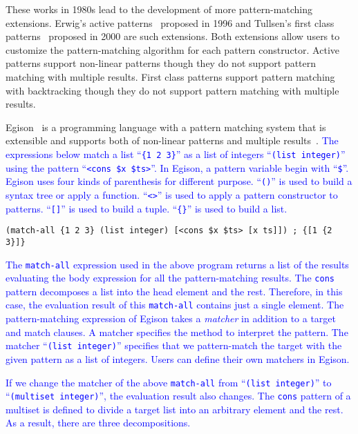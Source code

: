\documentclass[acmlarge]{acmart}
\newcommand{\new}[1]{\textcolor{blue}{#1}}
\begin{document}
These works in 1980s lead to the development of more pattern-matching extensions.
Erwig's active patterns~\cite{erwig1996active} proposed in 1996 and Tullsen's first class patterns~\cite{tullsen2000first} proposed in 2000 are such extensions.
Both extensions allow users to customize the pattern-matching algorithm for each pattern constructor.
Active patterns support non-linear patterns though they do not support pattern matching with multiple results.
First class patterns support pattern matching with backtracking though they do not support pattern matching with multiple results.

Egison~\cite{egisonWeb} is a programming language with a pattern matching system that is extensible and supports both of non-linear patterns and multiple results~\cite{egi2018aplas}.
\new{
The expressions below match a list ``\texttt{\{1 2 3\}}'' as a list of integers ``\lstinline{(list integer)}'' using the pattern ``\lstinline{<cons $x $ts>}''.
In Egison, a pattern variable begin with ``\lstinline{$}''.
Egison uses four kinds of parenthesis for different purpose.
``\lstinline{()}'' is used to build a syntax tree or apply a function.
``\lstinline{<>}'' is used to apply a pattern constructor to patterns.
``\lstinline{[]}'' is used to build a tuple.
``\texttt{\{\}}'' is used to build a list. %
}%

\begin{lstlisting}[language=egison]
(match-all {1 2 3} (list integer) [<cons $x $ts> [x ts]]) ; {[1 {2 3}]}
\end{lstlisting}

\noindent
\new{
The \lstinline{match-all} expression used in the above program returns a list of the results evaluating the body expression for all the pattern-matching results.
The \lstinline{cons} pattern decomposes a list into the head element and the rest.
Therefore, in this case, the evaluation result of this \lstinline{match-all} contains just a single element.
The pattern-matching expression of Egison takes a \emph{matcher} in addition to a target and match clauses.
A matcher specifies the method to interpret the pattern.
The matcher ``\lstinline{(list integer)}'' specifies that we pattern-match the target with the given pattern as a list of integers.
Users can define their own matchers in Egison.
}%

\new{
If we change the matcher of the above \lstinline{match-all} from ``\lstinline{(list integer)}'' to ``\lstinline{(multiset integer)}'', the evaluation result also changes.
The \lstinline{cons} pattern of a multiset is defined to divide a target list into an arbitrary element and the rest.
As a result, there are three decompositions.
}%
\end{document}
